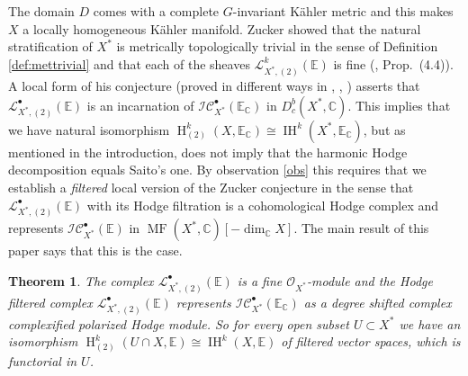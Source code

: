 \documentclass[12pt,letterpaper]{amsart}
\numberwithin{equation}{section}
\def\CC{{\mathbb C}}
\def\EE{{\mathbb E}}
\def\Iscr{{\mathscr I}}
\def\Lscr{{\mathscr L}}
\def\Ocal{{\mathcal O}}
\def\Cscr{{\mathscr C}}
\def\pt{{\scriptscriptstyle\bullet}}
\newcommand\Hl{\operatorname{H}}
\newcommand\IH{\operatorname{IH}}
\newcommand\MF{\operatorname{MF}}
\newtheorem{theorem}{Theorem}[section]
\theoremstyle{remark}
\begin{document}
 The domain  $D$ comes with a complete $G$-invariant K\"ahler metric and this makes 
$X$ a locally homogeneous  K\"ahler manifold. Zucker showed that the natural stratification of $X^*$ is metrically topologically trivial in the sense of Definition \ref{def:mettrivial} and  that each of the sheaves $\Lscr^k_{{X^*},(2)}(\EE)$ is fine (\cite{zucker:warped}, Prop.\ (4.4)). A local form of his conjecture 
(proved in different ways in \cite{looij:l2}, \cite{ss}, \cite{lr}) asserts that $\Lscr^\pt_{{X^*},(2)}(\EE)$ is an incarnation of  
$\Iscr\Cscr_{X^*}^\pt(\EE_\CC)$
in $D^b_c({X^*}, \CC)$. This implies that we have  natural isomorphism 
$\Hl^k_{(2)}(X, \EE_\CC)\cong \IH^k({X^*}, \EE_\CC)$, but as mentioned in the introduction, does not imply that 
the harmonic Hodge decomposition  equals Saito's one. 
By observation \ref{obs} this requires that we establish a \emph{filtered} local 
version of the Zucker conjecture in the sense that $\Lscr^\pt_{{X^*},(2)}(\EE)$ with its Hodge filtration is a 
cohomological Hodge complex and represents $\Iscr\Cscr^\pt_{X^*}(\EE)$ in $\MF(X^*,\CC)[-\dim_\CC X]$. The main result of this paper  says that this is the case.


\begin{theorem}\label{thm:main}
The complex $\Lscr^\pt_{{X^*},(2)}(\EE)$ is a fine $\Ocal_{X^*}$-module and  the Hodge filtered complex $\Lscr^\pt_{{X^*},(2)}(\EE)$ represents  $\Iscr\Cscr_{X^*}^\pt(\EE_\CC)$ as a degree shifted complex complexified  polarized Hodge module. So  for every open subset $U\subset X^*$ we have an isomorphism $\Hl_{(2)}^k(U\cap X, \EE)\cong \IH^k(X, \EE)$ of filtered vector spaces, which is functorial in $U$.
\end{theorem}
\end{document}

